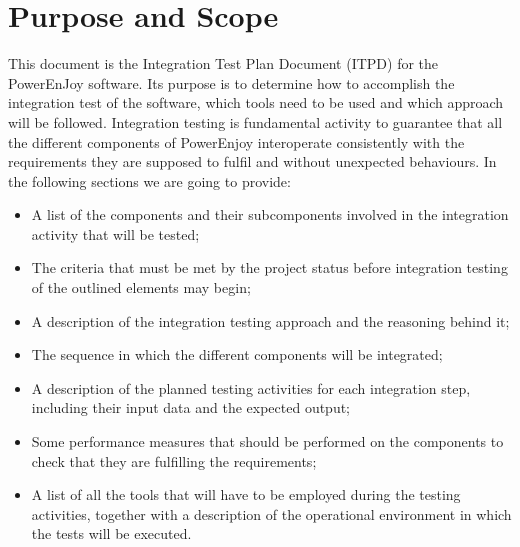 \section{Purpose and Scope}
This document is the Integration Test Plan Document (ITPD) for the PowerEnJoy
software. Its purpose is to determine how to accomplish the
integration test of the software, which tools need to be used and which approach
will be followed.
Integration testing is fundamental activity to guarantee that all the different components of PowerEnjoy interoperate consistently with the requirements they are supposed to fulfil and without unexpected behaviours.
In the following sections we are going to provide:
\begin{itemize}
\item A list of the components and their subcomponents involved in the integration activity that will be tested;
\item The criteria that must be met by the project status before integration testing of the outlined elements may begin;
\item A description of the integration testing approach and the reasoning behind it;
\item The sequence in which the different components will be integrated;
\item A description of the planned testing activities for each integration step, including their input data and the expected output;
\item Some performance measures that should be performed on the components to check that they are fulfilling the requirements;
\item A list of all the tools that will have to be employed during the testing activities, together with a description of the operational environment in which the tests will be executed.
\end{itemize} 
